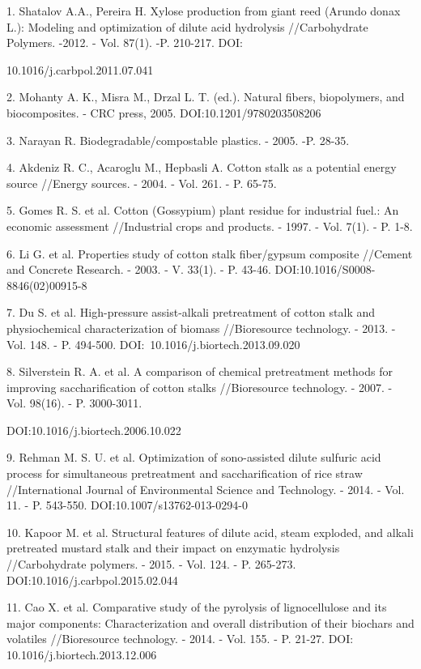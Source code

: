 \begin{noparindent}
1.
  Shatalov A.A., Pereira H. Xylose production from giant reed (Arundo
  donax L.): Modeling and optimization of dilute acid hydrolysis
  //Carbohydrate Polymers. -2012. - Vol. 87(1). -P. 210-217. DOI:

  10.1016/j.carbpol.2011.07.041

2.
  Mohanty A. K., Misra M., Drzal L. T. (ed.). Natural fibers,
  biopolymers, and biocomposites. - CRC press, 2005.
  DOI:10.1201/9780203508206

3.
  Narayan R. Biodegradable/compostable plastics. - 2005. -P. 28-35.

4.
  Akdeniz R. C., Acaroglu M., Hepbasli A. Cotton stalk as a potential
  energy source //Energy sources. - 2004. - Vol. 261. - P. 65-75.

5.
  Gomes R. S. et al. Cotton (Gossypium) plant residue for industrial
  fuel.: An economic assessment //Industrial crops and products. -
  1997. - Vol. 7(1). - P. 1-8.

6.
  Li G. et al. Properties study of cotton stalk fiber/gypsum composite
  //Cement and Concrete Research. - 2003. - V. 33(1). - P. 43-46.
  DOI:10.1016/S0008-8846(02)00915-8

7.
  Du S. et al. High-pressure assist-alkali pretreatment of cotton stalk
  and physiochemical characterization of biomass //Bioresource
  technology. - 2013. - Vol. 148. - P. 494-500.
  DOI:~10.1016/j.biortech.2013.09.020

8.
  Silverstein R. A. et al. A comparison of chemical pretreatment methods
  for improving saccharification of cotton stalks //Bioresource
  technology. - 2007. - Vol. 98(16). - P. 3000-3011.

  DOI:10.1016/j.biortech.2006.10.022

9.
  Rehman M. S. U. et al. Optimization of sono-assisted dilute sulfuric
  acid process for simultaneous pretreatment and saccharification of
  rice straw //International Journal of Environmental Science and
  Technology. - 2014. - Vol. 11. - P. 543-550.
  DOI:10.1007/s13762-013-0294-0

10.
  Kapoor M. et al. Structural features of dilute acid, steam exploded,
  and alkali pretreated mustard stalk and their impact on enzymatic
  hydrolysis //Carbohydrate polymers. - 2015. - Vol. 124. - P.
  265-273. DOI:10.1016/j.carbpol.2015.02.044

11.
  Cao X. et al. Comparative study of the pyrolysis of lignocellulose and
  its major components: Characterization and overall distribution of
  their biochars and volatiles //Bioresource technology. - 2014. -
  Vol. 155. - P. 21-27. DOI: 10.1016/j.biortech.2013.12.006


\end{noparindent}
